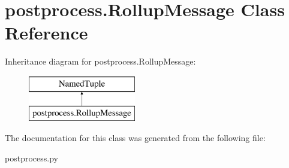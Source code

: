 \hypertarget{classpostprocess_1_1_rollup_message}{}\section{postprocess.\+Rollup\+Message Class Reference}
\label{classpostprocess_1_1_rollup_message}
Inheritance diagram for postprocess.\+Rollup\+Message\+:\begin{figure}[H]
\begin{center}
\leavevmode
\includegraphics[height=2.000000cm]{de/d60/classpostprocess_1_1_rollup_message}
\end{center}
\end{figure}


The documentation for this class was generated from the following file\+:\begin{DoxyCompactItemize}
\item 
postprocess.\+py\end{DoxyCompactItemize}
